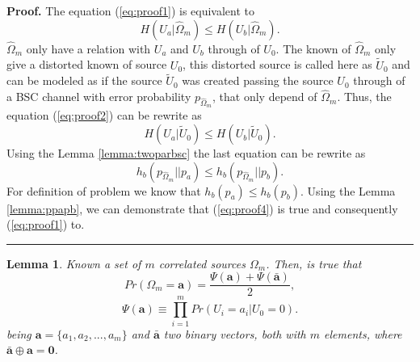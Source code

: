 \documentclass[a4paper,10pt]{article}
\newtheorem{mylemma}[mytheorem]{Lemma}
\newenvironment{myproof}[1][Proof]{\textbf{#1.} }{\ \rule{0.5em}{0.5em}}
\begin{document}
\begin{myproof}
\label{proof:minimo}
The equation (\ref{eq:proof1}) is equivalent to
\begin{equation}\label{eq:proof2}
 H( U_{a}| \hat{\Omega}_{m}) \leq H(U_b| \hat{\Omega}_{m} ).
\end{equation} 
$\hat{\Omega}_{m}$  only have a relation with $U_a$ and $U_b$ through of $U_0$. The
known of $\hat{\Omega}_{m}$ only give a distorted known of source $U_0$, this
distorted source is called here as $\tilde{U}_0$ and can be modeled as
 if the source $\tilde{U}_0$ was created passing the source $U_0$ through of
a BSC channel with error probability $p_{\hat{\Omega}_{m}}$, that only depend of 
$\hat{\Omega}_{m}$. Thus, the equation (\ref{eq:proof2}) can be rewrite as 
\begin{equation}\label{eq:proof3}
 H( U_{a}| \tilde{U}_0) \leq H(U_b| \tilde{U}_0 ).
\end{equation} 
Using the Lemma \ref{lemma:twoparbsc} the last equation can be rewrite as
\begin{equation}\label{eq:proof4}
h_b( p_{\hat{\Omega}_{m}}||p_{a} ) \leq h_b( p_{\hat{\Omega}_{m}}||p_{b} ).
\end{equation} 
For definition of problem we know that $h_b(p_a) \leq h_b(p_b)$. Using the 
Lemma \ref{lemma:ppapb}, we can demonstrate that (\ref{eq:proof4}) is true
and consequently (\ref{eq:proof1}) to. 
\end{myproof}
\begin{mdframed}[style=MDFStyGrayScreen]
\begin{mylemma}
 \label{lemm:PrA}
Known a set of $m$ correlated  sources  $\Omega_m$. Then, is true that
\begin{equation}\label{eq:PA}
Pr(\Omega_m=\mathbf{a})=\frac{ \Psi(\mathbf{a}) + \Psi(\mathbf{\bar{a}}) }{2},
\end{equation}
\begin{equation}\label{eq:PAequiv}
\Psi(\mathbf{a}) \equiv \prod \limits_{i=1}^{m}{Pr(U_i=a_i|U_0=0)}.
\end{equation}
being $\mathbf{a}=\{a_1, a_2, ..., a_m\}$ and $\mathbf{\bar{a}}$ two 
binary vectors, both with $m$ elements, where $\mathbf{\bar{a}}\oplus \mathbf{a}=\mathbf{0}$. 
\end{mylemma}
\end{mdframed}
\end{document}
